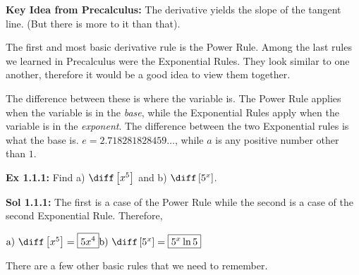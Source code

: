 \textbf{Key Idea from Precalculus:} The derivative yields the slope of the tangent line. (But there is more to it than that). \par
The first and most basic derivative rule is the Power Rule. Among the last rules we learned in Precalculus were the Exponential Rules. They look similar to one another, therefore it would be a good idea to view them together. 


\begin{center}
\end{center}


The difference between these is where the variable is. The Power Rule applies when the variable is in the \textit{base}, while the Exponential Rules apply when the variable is in the \textit{exponent}. The difference between the two Exponential rules is what the base is. $e = 2.718281828459 \dots$, while $a$ is any positive number other than $1$. \par 


\begin{tcolorbox}[example]
    \textbf{Ex 1.1.1: } Find a) $\diff \left[x^5\right]$ and b) $\diff \left[5^x\right]$. 
\end{tcolorbox} 
\begin{tcolorbox}[solution]
    \textbf{Sol 1.1.1: } The first is a case of the Power Rule while the second is a case of the second Exponential Rule. Therefore, \\
\begin{center}
$\hfill \text{a) } \diff \left[x^5\right] = \boxed{5x^4} \hfill \text{b) } \diff \left[5^x\right] = \boxed{5^x \ln{5}} \hfill$
\end{center} 
\end{tcolorbox} \vspace{11pt}


There are a few other basic rules that we need to remember. 

